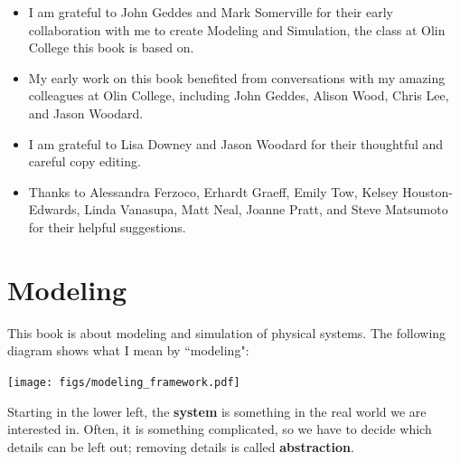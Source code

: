 \documentclass[12pt]{book}
\theoremstyle{exercise}
\begin{document}
\begin{itemize}

\item I am grateful to John Geddes and Mark Somerville for their early collaboration with me to create Modeling and Simulation, the class at Olin College this book is based on.

\item My early work on this book benefited from conversations with
my amazing colleagues at Olin College, including John Geddes, Alison
Wood, Chris Lee, and Jason Woodard.

\item I am grateful to Lisa Downey and Jason Woodard for their thoughtful and careful copy editing.

\item Thanks to Alessandra Ferzoco, Erhardt Graeff, Emily Tow,
Kelsey Houston-Edwards, Linda Vanasupa, Matt Neal, Joanne Pratt, and Steve Matsumoto for their helpful suggestions.


\end{itemize}



\normalsize

\cleardoublepage

\begin{latexonly}


\cleardoublepage

\end{latexonly}

\mainmatter


\chapter{Modeling}
\label{chap01}

This book is about modeling and simulation of physical systems.  
The following diagram shows what I mean by ``modeling":


\vspace{0.2in}
\centerline{\texttt{[image: figs/modeling\_framework.pdf]}}

Starting in the lower left, the {\bf system} is something in the real world we are interested in.  Often, it is something complicated, so we have to decide which details can be left out; removing details is called {\bf abstraction}.
\end{document}

